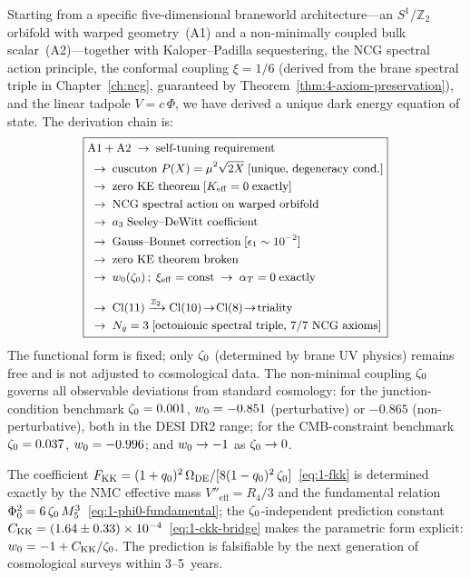 Starting from a specific five-dimensional braneworld architecture---an $S^1/\mathbb{Z}_2$ orbifold with warped geometry~(A1) and a non-minimally coupled bulk scalar~(A2)---together with Kaloper--Padilla sequestering, the NCG spectral action principle, the conformal coupling $\xi = 1/6$ (derived from the brane spectral triple in Chapter~\ref{ch:ncg}, guaranteed by Theorem~\ref{thm:4-axiom-preservation}), and the linear tadpole $V = c\,\Phi$, we have derived a unique dark energy equation of state. The derivation chain is:
\begin{equation}
\label{eq:1-chain-final}
\boxed{\small
\begin{aligned}
&\mathrm{A1 + A2} \;\to\; \text{self-tuning requirement} \\
&\;\to\; \text{cuscuton } P(X) = \mu^2\sqrt{2X}\; [\text{unique, degeneracy cond.}] \\
&\;\to\; \text{zero KE theorem}\; [K_{\mathrm{eff}} = 0\;\text{exactly}] \\
&\;\to\; \text{NCG spectral action on warped orbifold} \\
&\;\to\; a_3\;\text{Seeley--DeWitt coefficient} \\
&\;\to\; \text{Gauss--Bonnet correction}\; [\epsilon_1 \sim 10^{-2}] \\
&\;\to\; \text{zero KE theorem broken} \\
&\;\to\; w_0(\zeta_0)\,;\; \xi_{\mathrm{eff}} = \mathrm{const} \;\to\; \alpha_T = 0\;\text{exactly} \\[6pt]
&\;\to\; \mathrm{Cl}(11) \xrightarrow{\mathbb{Z}_2}
            \mathrm{Cl}(10) \!\to\! \mathrm{Cl}(8) \!\to\! \text{triality} \\
&\;\to\; N_g = 3\; [\text{octonionic spectral triple, 7/7 NCG axioms}]
\end{aligned}
}
\end{equation}
The functional form is fixed; only $\zeta_0$ (determined by brane UV physics) remains free and is not adjusted to cosmological data. The non-minimal coupling $\zeta_0$ governs all observable deviations from standard cosmology: for the junction-condition benchmark $\zeta_0 = 0.001$, $w_0 = -0.851$ (perturbative) or $-0.865$ (non-perturbative), both in the DESI DR2 range; for the CMB-constraint benchmark $\zeta_0 = 0.037$, $w_0 = -0.996$; and $w_0 \to -1$ as $\zeta_0 \to 0$.

The coefficient $F_{\mathrm{KK}} = (1+q_0)^2\,\Omega_{\mathrm{DE}}/[8(1-q_0)^2\,\zeta_0]$~\eqref{eq:1-fkk} is determined exactly by the NMC effective mass $V''_{\mathrm{eff}} = R_4/3$ and the fundamental relation $\Phi_0^2 = 6\,\zeta_0\,M_5^3$~\eqref{eq:1-phi0-fundamental}; the $\zeta_0$-independent prediction constant $C_{\mathrm{KK}} = (1.64 \pm 0.33) \times 10^{-4}$~\eqref{eq:1-ckk-bridge} makes the parametric form explicit: $w_0 = -1 + C_{\mathrm{KK}}/\zeta_0$. The prediction is falsifiable by the next generation of cosmological surveys within 3--5~years.

